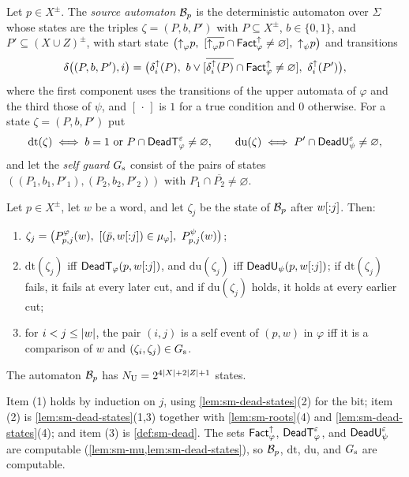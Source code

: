 \begin{definition}\label{def:un-source}
Let $p\in X^\pm$. The \emph{source automaton} $\mathcal B_p$ is the deterministic
automaton over $\Sigma$ whose states are the triples $\zeta=(P,b,P')$ with
$P\subseteq X^\pm$, $b\in\{0,1\}$, and $P'\subseteq(X\cup Z)^\pm$, with start
state $\bigl(\upc\varphi p,\ [\overline{\upc\varphi p}\cap\Fup\varphi\ne
\varnothing],\ \upc\psi p\bigr)$ and transitions
\[
 \delta\bigl((P,b,P'),i\bigr)=\bigl(\delta^{\uparrow}_{i}(P),\
 b\lor[\overline{\delta^{\uparrow}_{i}(P)}\cap\mathsf{Fact}^{\uparrow}_{\varphi}\ne\varnothing],\
 \delta^{\uparrow}_{i}(P')\bigr),
\]
where the first component uses the transitions of the upper automata of
$\varphi$ and the third those of $\psi$, and $[\,\cdot\,]$ is $1$ for a true
condition and $0$ otherwise. For a state $\zeta=(P,b,P')$ put
\[
 \mathrm{dt}(\zeta)\iff b=1\ \text{or}\ P\cap\DeadT^\eps_\varphi\ne\varnothing,
 \qquad
 \mathrm{du}(\zeta)\iff P'\cap\DeadU^\eps_\psi\ne\varnothing,
\]
and let the \emph{self guard} $G_{\mathrm{s}}$ consist of the pairs of states
$((P_1,b_1,P'_1),(P_2,b_2,P'_2))$ with $P_1\cap\overline{P_2}\ne\varnothing$.
\end{definition}

\begin{lemma}\label{lem:un-source}
Let $p\in X^\pm$, let $w$ be a word, and let $\zeta_j$ be the state of
$\mathcal B_p$ after $w[{:}j]$. Then:
\begin{enumerate}[leftmargin=*]
\item $\zeta_j=\bigl(P^\varphi_{p,j}(w),\ [(\bar p,\wpre wj)\in\mu_\varphi],\
  P^\psi_{p,j}(w)\bigr)$;
\item $\mathrm{dt}(\zeta_j)$ iff $\mathsf{DeadT}_\varphi(p,w[{:}j])$, and
  $\mathrm{du}(\zeta_j)$ iff $\mathsf{DeadU}_\psi(p,w[{:}j])$; if
  $\mathrm{dt}(\zeta_j)$ fails, it fails at every later cut, and if
  $\mathrm{du}(\zeta_j)$ holds, it holds at every earlier cut;
\item for $i<j\le\lvert w\rvert$, the pair $(i,j)$ is a self event of $(p,w)$ in
  $\varphi$ iff it is a comparison of $w$ and $(\zeta_i,\zeta_j)\in G_{\mathrm{s}}$.
\end{enumerate}
The automaton $\mathcal B_p$ has $N_{\mathrm U}=2^{4\lvert X\rvert+2\lvert Z\rvert+1}$ states.
\end{lemma}

Item (1) holds by induction on $j$, using \cref{lem:sm-dead-states}(2) for
the bit; item (2) is \cref{lem:sm-dead-states}(1,3) together with
\cref{lem:sm-roots}(4) and \cref{lem:sm-dead-states}(4); and item (3) is
\cref{def:sm-dead}. The sets $\mathsf{Fact}^{\uparrow}_{\varphi}$, $\mathsf{DeadT}^\varepsilon_\varphi$, and
$\mathsf{DeadU}^\varepsilon_\psi$ are computable (\cref{lem:sm-mu,lem:sm-dead-states}), so
$\mathcal B_p$, $\mathrm{dt}$, $\mathrm{du}$, and $G_{\mathrm{s}}$ are computable.

